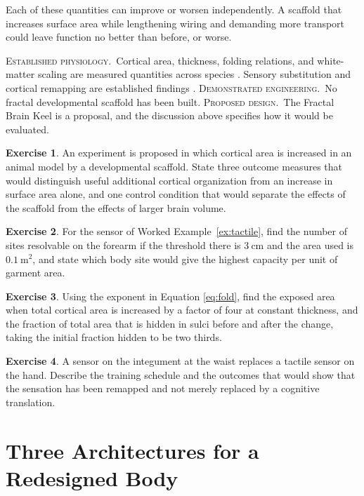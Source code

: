\documentclass[11pt,openany]{book}
\theoremstyle{definition}
\newtheorem{exercise}{Exercise}[chapter]
\theoremstyle{remark}
\newcommand{\est}{\textsc{Established physiology.}\ }
\newcommand{\dem}{\textsc{Demonstrated engineering.}\ }
\newcommand{\pro}{\textsc{Proposed design.}\ }
\begin{document}
Each of these quantities can improve or worsen independently. A scaffold that increases surface area while lengthening wiring and demanding more transport could leave function no better than before, or worse.

\begin{evidence}
\est Cortical area, thickness, folding relations, and white-matter scaling are measured quantities across species \cite{mota2015,zhang2000,zilles2013,hofman2014}. Sensory substitution and cortical remapping are established findings \cite{bachyrita1969,flor1995}. \dem No fractal developmental scaffold has been built. \pro The Fractal Brain Keel is a proposal, and the discussion above specifies how it would be evaluated.
\end{evidence}

\begin{exercise}
An experiment is proposed in which cortical area is increased in an animal model by a developmental scaffold. State three outcome measures that would distinguish useful additional cortical organization from an increase in surface area alone, and one control condition that would separate the effects of the scaffold from the effects of larger brain volume.
\end{exercise}

\begin{exercise}
For the sensor of Worked Example~\ref{ex:tactile}, find the number of sites resolvable on the forearm if the threshold there is $3\ \mathrm{cm}$ and the area used is $0.1\ \mathrm{m^{2}}$, and state which body site would give the highest capacity per unit of garment area.
\end{exercise}

\begin{exercise}
Using the exponent in Equation \eqref{eq:fold}, find the exposed area when total cortical area is increased by a factor of four at constant thickness, and the fraction of total area that is hidden in sulci before and after the change, taking the initial fraction hidden to be two thirds.
\end{exercise}

\begin{exercise}
A sensor on the integument at the waist replaces a tactile sensor on the hand. Describe the training schedule and the outcomes that would show that the sensation has been remapped and not merely replaced by a cognitive translation.
\end{exercise}

\part{Three Architectures for a Redesigned Body}
\end{document}
